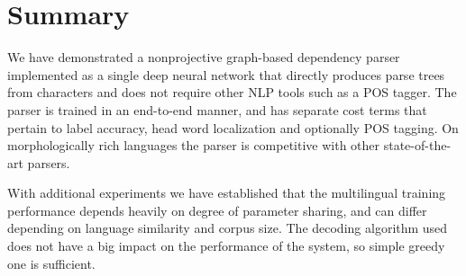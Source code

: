 \chapter{Summary}
We have demonstrated a nonprojective graph-based dependency parser implemented as a single deep
neural network that directly produces parse trees from characters and does not require
other NLP tools such as a POS tagger. The parser is trained in an end-to-end manner,
and has separate cost terms that pertain to label accuracy,
head word localization and optionally POS tagging. On
morphologically rich languages the parser is competitive
with other state-of-the-art parsers.

With additional experiments we have established that the multilingual training
performance depends heavily on degree of parameter sharing, and can differ
depending on language similarity and corpus size. The decoding
algorithm used does not have a big impact on the performance of the system,
so simple greedy one is sufficient.

